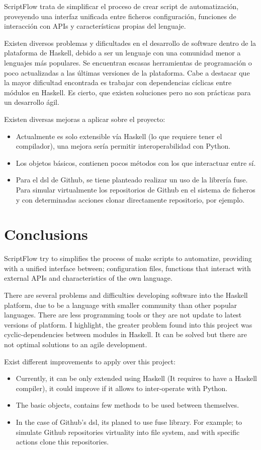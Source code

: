 \documentclass[11pt]{article}
\begin{document}
ScriptFlow trata de simplificar el proceso de crear script de automatización, proveyendo una interfaz unificada entre ficheros
configuración, funciones de interacción con APIs y características propias del lenguaje.

Existen diversos problemas y dificultades en el desarrollo de software dentro de la plataforma de Haskell, debido a ser un lenguaje
con una comunidad menor a lenguajes más populares. Se encuentran escasas herramientas de programación o poco actualizadas a las últimas versiones de la plataforma.
Cabe a destacar que la mayor dificultad encontrada es trabajar con dependencias cíclicas entre módulos en Haskell. Es cierto, que existen soluciones pero
no son prácticas para un desarrollo ágil.

Existen diversas mejoras a aplicar sobre el proyecto:
\begin{itemize}
\item Actualmente es solo extensible vía Haskell (lo que requiere tener el compilador), una mejora sería permitir interoperabilidad con Python.
\item Los objetos básicos, contienen pocos métodos con los que interactuar entre sí.
\item Para el \gls{dsl} de Github, se tiene planteado realizar un uso de la librería \gls{fuse}. Para simular virtualmente los repositorios de Github en el sistema de ficheros
y con determinadas acciones clonar directamente repositorio, por ejemplo.
\end{itemize}

\section{Conclusions}
\label{sec:orgf52ad18}

ScriptFlow try to simplifies the process of make scripts to automatize, providing with a unified interface between; configuration files, functions that interact with external APIs and
characteristics of the own language.

There are several problems and difficulties developing software into the Haskell platform, due to be a language with smaller community than other popular languages. There are less programming
tools or they are not update to latest versions of platform. I highlight, the greater problem found into this project was cyclic-dependencies between modules in Haskell. It can be solved but there are not optimal
solutions to an agile development.

Exist different improvements to apply over this project:
\begin{itemize}
\item Currently, it can be only extended using Haskell (It requires to have a Haskell compiler), it could improve if it allows to inter-operate with Python.
\item The basic objects, contains few methods to be used between themselves.
\item In the case of Github's \gls{dsl}, its planed to use \gls{fuse} library. For example; to simulate Github repositories virtuality into file system, and with specific actions clone this repositories.
\end{itemize}
\end{document}
